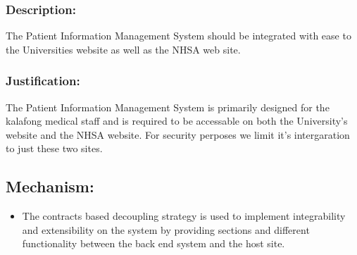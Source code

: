 \subsubsection *{Description:}
	  The Patient Information Management System should be integrated with ease to the Universities website as well as the NHSA web site.
	 \subsubsection *{Justification:}
	   The Patient Information Management System is primarily designed for the kalafong medical staff and is required to be accessable on both the University's website and the NHSA website. For security perposes we limit it's intergaration to just these two sites.
	\subsection *{Mechanism:}
	\begin{itemize}
		\item The contracts based decoupling strategy is used to implement integrability and extensibility on the system by providing sections and different functionality between the back end system and the host site. 
	\end{itemize}